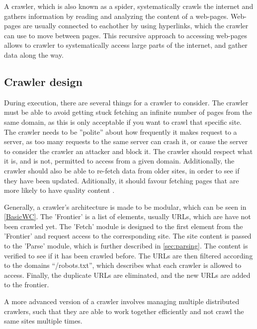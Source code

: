 A crawler, which is also known as a spider, systematically crawls the internet
and gathers information by reading and analyzing the content of a web-pages.
Web-pages are usually connected to eachother by using hyperlinks, which the
crawler can use to move between pages. This recursive approach to accessing
web-pages allows to crawler to systematically access large parts of the
internet, and gather data along the way.

\subsection{Crawler design}%
During execution, there are several things for a crawler to consider.
The crawler must be able to avoid getting stuck fetching an infinite number of
pages from the same domain, as this is only acceptable if you want to crawl that
specific site.
The crawler needs to be ''polite'' about how frequently it makes request to a
server, as too many requests to the same server can crash it, or cause the
server to consider the crawler an attacker and block it.
The crawler should respect what it is, and is not, permitted to access from a
given domain. Additionally, the crawler should also be able to re-fetch data
from older sites, in order to see if they have been updated. Aditionally, it
should favour fetching pages that are more likely to have quality content \citep[Ch.
20.1]{manning2008introduction}.\nl
 
Generally, a crawler's architecture is made to be modular, which can be seen in
\autoref{BasicWC}. The 'Frontier' is a list of elements, usually URLs, which are
have not been crawled yet. The 'Fetch' module is designed to the first element from
the 'Frontier' and request access to the corresponding site. The site content is
passed to the 'Parse' module, which is further described in
\autoref{sec:parsing}. The content is verified to see if it has been crawled
before. The URLs are then filtered according to the domains ``/robots.txt'',
which describes what each crawler is allowed to access. Finally, the duplicate
URLs are eliminated, and the new URLs are added to the frontier.\nl




A more advanced version of a crawler involves managing multiple distributed
crawlers, such that they are able to work together efficiently and not crawl
the same sites multiple times.


